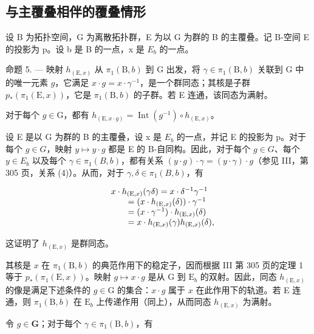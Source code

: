 \subsection{与主覆叠相伴的覆叠情形}

设 B 为拓扑空间，G 为离散拓扑群，E 为以 G 为群的 B 的主覆叠。记 B-空间 E 的投影为 p。设 b 是 B 的一点，x 是 \(E_{b}\) 的一点。

命题 5. --- 映射 \(h_{(\mathrm{E},x)}\) 从 \(\pi_1(\mathrm{B},b)\) 到 G 出发，将 \(\gamma \in \pi_1(\mathrm{B},b)\) 关联到 G 中的唯一元素 \(g\)，它满足 \(x \cdot g = x \cdot \gamma^{-1}\)，是一个群同态；其核是子群 \(p_*(\pi_1(\mathrm{E},x))\)，它是 \(\pi_1(\mathrm{B},b)\) 的子群。若 E 连通，该同态为满射。

对于每个 \(g \in \mathrm{G}\)，都有 \(h_{(\mathrm{E},x \cdot g)} = \operatorname{Int}(g^{-1}) \circ h_{(\mathrm{E},x)}\)。

设 E 是以 G 为群的 B 的主覆叠，设 x 是 \(E_{b}\) 的一点，并记 E 的投影为 p。对于每个 \(g \in G\)，映射 \(y \mapsto y \cdot g\) 都是 E 的 B-自同构。因此，对于每个 \(g \in G\)、每个 \(y \in E_{b}\) 以及每个 \(\gamma \in \pi_{1}(B, b)\)，都有关系 \((y \cdot g) \cdot \gamma = (y \cdot \gamma) \cdot g\)（参见 III，第 305 页，关系 (4)）。从而，对于 \(\gamma, \delta \in \pi_{1}(B, b)\)，有

\[
\begin{array}{r l} & {x \cdot h _ {(\mathrm{E}, x)} (\gamma \delta) = x \cdot \delta^ {- 1} \gamma^ {- 1}} \\ & {\qquad = (x \cdot h _ {(\mathrm{E}, x)} (\delta)) \cdot \gamma^ {- 1}} \\ & {\qquad = (x \cdot \gamma^ {- 1}) \cdot h _ {(\mathrm{E}, x)} (\delta)} \\ & {\qquad = x \cdot h _ {(\mathrm{E}, x)} (\gamma) h _ {(\mathrm{E}, x)} (\delta),} \end{array}
\]

这证明了 \(h_{(\mathrm{E},x)}\) 是群同态。

其核是 \(x\) 在 \(\pi_1(\mathrm{B}, b)\) 的典范作用下的稳定子，因而根据 III 第 305 页的定理 1 等于 \(p_*(\pi_1(\mathrm{E}, x))\)。映射 \(g \mapsto x \cdot g\) 是从 G 到 \(\mathrm{E}_b\) 的双射。因此，同态 \(h_{(\mathrm{E}, x)}\) 的像是满足下述条件的 \(g \in \mathrm{G}\) 的集合：\(x \cdot g\) 属于 \(x\) 在此作用下的轨道。若 E 连通，则 \(\pi_1(\mathrm{B}, b)\) 在 \(\mathrm{E}_b\) 上传递作用（同上），从而同态 \(h_{(\mathrm{E}, x)}\) 为满射。

令 \(g\in \mathbf{G}\)；对于每个 \(\gamma \in \pi_1(\mathrm{B},b)\)，有

